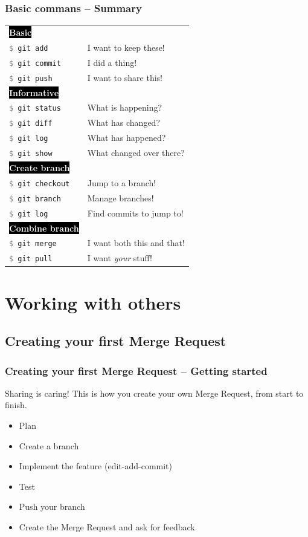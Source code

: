 \documentclass{beamer}
\newcommand{\keyword}[1]{\hspace{-1.0em}\colorbox{black}{\textcolor{white}{\textbf{#1}\vphantom{Ep}}}\vspace{0.2em}} %
\newcommand{\command}[1]{\texttt{\textcolor{gray}{\$} {#1}}}
\begin{document}
\begin{frame}[fragile]
  \frametitle{Basic commans -- Summary}
  \begin{tabular}{ll}
    \keyword{Basic} & \\
    \command{git add} & I want to keep these! \\
    \command{git commit} & I did a thing! \\
    \command{git push} & I want to share this! \\ %

    \keyword{Informative} & \\
    \command{git status} & What is happening? \\
    \command{git diff} & What has changed? \\
    \command{git log} & What has happened? \\
    \command{git show} & What changed over there? \\

    \keyword{Create branch} & \\
    \command{git checkout} & Jump to a branch! \\
    \command{git branch} & Manage branches! \\
    \command{git log} & Find commits to jump to! \\

    \keyword{Combine branch} & \\
    \command{git merge} & I want both this and that! \\
    \command{git pull} & I want \emph{your} stuff! \\
  \end{tabular}
\end{frame}

\section{Working with others}
\subsection{Creating your first Merge Request}

\begin{frame}[fragile]
  \frametitle{Creating your first Merge Request -- Getting started}
  Sharing is caring! This is how you create your own Merge Request, from start
  to finish.
  \pause{}
  \begin{itemize}[<+->]
    \item Plan
    \item Create a branch
    \item Implement the feature (edit-add-commit)
    \item Test
    \item Push your branch
    \item Create the Merge Request and ask for feedback
  \end{itemize}
\end{frame}
\end{document}

